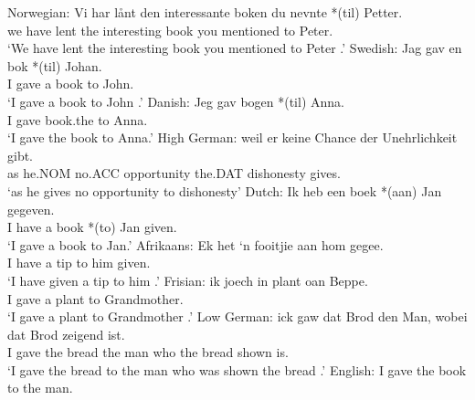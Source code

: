 \begin{exe}
	\ex \label{ex:preprec}
	\begin{xlist}
		\ex Norwegian:
		\gll Vi har lånt den interessante boken du nevnte *(til) Petter.\\
		we have lent the interesting book you mentioned to Peter.\\
		\trans `We have lent the interesting book you mentioned to Peter \citep{Larson.1988}.'
		\ex Swedish:
		\ex \gll Jag gav en bok *(til) Johan.\\
		I gave a book to John.\\
		\trans `I gave a book to John \citep{Holmberg.1995}.'
		\ex Danish:	
		\gll Jeg gav bogen *(til) Anna.\\
		I gave book.the to Anna.\\
		\trans `I gave the book to Anna\citep{Holmberg.1998}.'
		\ex High German:
		\gll weil er keine Chance der Unehrlichkeit gibt.\\
		as he.NOM no.ACC opportunity the.DAT dishonesty gives.\\
		\trans `as he gives no opportunity to dishonesty'
		\ex Dutch:
		\gll Ik heb een boek *(aan) Jan gegeven.\\
		I have a book *(to) Jan given.\\
		\trans `I gave a book to Jan.'
		\ex Afrikaans: 
		\gll Ek het `n fooitjie aan hom gegee.\\
		I have a tip to him given.\\
		\trans `I have given a tip to him \citep{Stadler.1996}.'
		\ex Frisian:
		\gll ik joech in plant oan Beppe.\\
		I gave a plant to Grandmother.\\
		\trans `I gave a plant to Grandmother \citep{Tiersma.1985}.'
		\ex Low German:
		\gll ick gaw dat Brod den Man, wobei dat Brod zeigend ist.\\
		I gave the bread the man who the bread shown is.\\
		\trans `I gave the bread to the man who was shown the bread \citep{Mussaus.1829}.'
		\ex English: I gave the book to the man.
	\end{xlist}
\end{exe}

